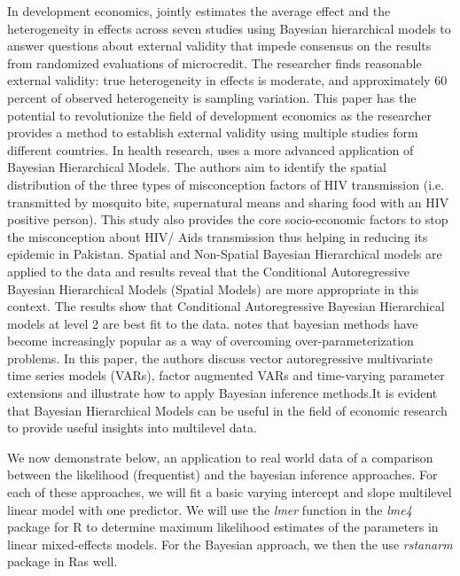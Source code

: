 In development economics, \cite{ meager2019understanding} jointly estimates the average effect and the heterogeneity in effects across seven studies using Bayesian hierarchical models to answer questions about external validity that impede consensus on the results from randomized evaluations of microcredit. The researcher finds reasonable external validity: true heterogeneity in effects is moderate, and approximately 60 percent of observed heterogeneity is sampling variation. This paper has the potential to revolutionize the field of development economics as the researcher provides a method to establish external validity using multiple studies form different countries. In health research, \cite{ rashid2019socio} uses a more advanced application of Bayesian Hierarchical Models. The authors aim to identify the spatial distribution of the three types of misconception factors of HIV transmission (i.e. transmitted by mosquito bite, supernatural means and sharing food with an HIV positive person). This study also provides the core socio-economic factors to stop the misconception about HIV/ Aids transmission thus helping in reducing its epidemic in Pakistan. Spatial and Non-Spatial Bayesian Hierarchical models are applied to the data and results reveal that the Conditional Autoregressive Bayesian Hierarchical Models (Spatial Models) are more appropriate in this context. The results show that Conditional Autoregressive Bayesian Hierarchical models at level 2 are best fit to the data.  \cite{ koop2010bayesian} notes that bayesian methods have become increasingly popular as a way of overcoming over-parameterization problems. In this paper, the authors discuss vector autoregressive multivariate time series models (VARs), factor augmented VARs and time-varying parameter extensions and illustrate how to apply Bayesian inference methods.It is evident that Bayesian Hierarchical Models can be useful in the field of economic research to provide useful insights into multilevel data.

We now demonstrate below, an application to real world data of a comparison between the likelihood (frequentist)  and the bayesian inference approaches. For each of these approaches, we will fit a basic varying intercept and slope multilevel linear model with one predictor. We will use the \textit{lmer} function in the \textit{lme4} package for R to determine maximum likelihood estimates of the parameters in linear mixed-effects models. For the Bayesian approach, we then the use \textit{rstanarm} package in Ras well.




